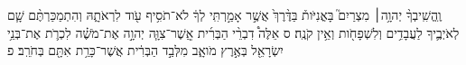 \documentclass{openreader}
\begin{document}
וֶֽהֱשִֽׁיבְךָ֨ יְהוָ֥ה׀ מִצְרַיִם֮ בָּאֳנִיֹּות֒ בַּדֶּ֨רֶךְ֙ אֲשֶׁ֣ר אָמַ֣רְתִּֽי לְךָ֔ לֹא־תֹסִ֥יף עֹ֖וד לִרְאֹתָ֑הּ וְהִתְמַכַּרְתֶּ֨ם שָׁ֧ם לְאֹיְבֶ֛יךָ לַעֲבָדִ֥ים וְלִשְׁפָחֹ֖ות וְאֵ֥ין קֹנֶֽה׃ ס 
אֵלֶּה֩ דִבְרֵ֨י הַבְּרִ֜ית אֲֽשֶׁר־צִוָּ֧ה יְהוָ֣ה אֶת־מֹשֶׁ֗ה לִכְרֹ֛ת אֶת־בְּנֵ֥י יִשְׂרָאֵ֖ל בְּאֶ֣רֶץ מֹואָ֑ב מִלְּבַ֣ד הַבְּרִ֔ית אֲשֶׁר־כָּרַ֥ת אִתָּ֖ם בְּחֹרֵֽב׃ פ 
\end{document}

